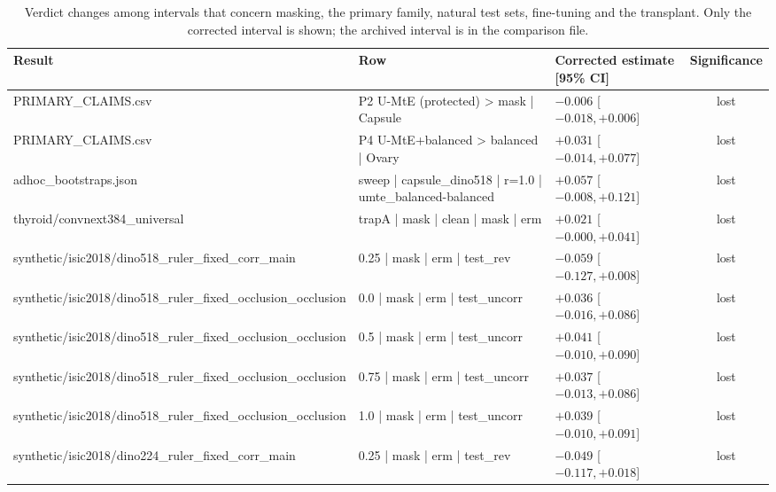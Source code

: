 \begin{table}[H]\centering\scriptsize
\caption{Verdict changes among intervals that concern masking, the primary family, natural test sets, fine-tuning and the transplant. Only the corrected interval is shown; the archived interval is in the comparison file.}\label{tab:corrclaims}
\begin{tabular}{p{4.6cm}p{5.2cm}p{3.4cm}c}\toprule
Result & Row & Corrected estimate [95\% CI] & Significance \\\midrule
PRIMARY\_\allowbreak{}CLAIMS.csv & P2 U-MtE (protected) > mask | Capsule & $-0.006$ [$-0.018, +0.006$] & lost \\
PRIMARY\_\allowbreak{}CLAIMS.csv & P4 U-MtE+balanced > balanced | Ovary & $+0.031$ [$-0.014, +0.077$] & lost \\
adhoc\_\allowbreak{}bootstraps.json & sweep | capsule\_\allowbreak{}dino518 | r=1.0 | umte\_\allowbreak{}balanced-balanced & $+0.057$ [$-0.008, +0.121$] & lost \\
thyroid/\allowbreak{}convnext384\_\allowbreak{}universal & trapA | mask | clean | mask | erm & $+0.021$ [$-0.000, +0.041$] & lost \\
synthetic/\allowbreak{}isic2018/\allowbreak{}dino518\_\allowbreak{}ruler\_\allowbreak{}fixed\_\allowbreak{}corr\_\allowbreak{}main & 0.25 | mask | erm | test\_\allowbreak{}rev & $-0.059$ [$-0.127, +0.008$] & lost \\
synthetic/\allowbreak{}isic2018/\allowbreak{}dino518\_\allowbreak{}ruler\_\allowbreak{}fixed\_\allowbreak{}occlusion\_\allowbreak{}occlusion & 0.0 | mask | erm | test\_\allowbreak{}uncorr & $+0.036$ [$-0.016, +0.086$] & lost \\
synthetic/\allowbreak{}isic2018/\allowbreak{}dino518\_\allowbreak{}ruler\_\allowbreak{}fixed\_\allowbreak{}occlusion\_\allowbreak{}occlusion & 0.5 | mask | erm | test\_\allowbreak{}uncorr & $+0.041$ [$-0.010, +0.090$] & lost \\
synthetic/\allowbreak{}isic2018/\allowbreak{}dino518\_\allowbreak{}ruler\_\allowbreak{}fixed\_\allowbreak{}occlusion\_\allowbreak{}occlusion & 0.75 | mask | erm | test\_\allowbreak{}uncorr & $+0.037$ [$-0.013, +0.086$] & lost \\
synthetic/\allowbreak{}isic2018/\allowbreak{}dino518\_\allowbreak{}ruler\_\allowbreak{}fixed\_\allowbreak{}occlusion\_\allowbreak{}occlusion & 1.0 | mask | erm | test\_\allowbreak{}uncorr & $+0.039$ [$-0.010, +0.091$] & lost \\
synthetic/\allowbreak{}isic2018/\allowbreak{}dino224\_\allowbreak{}ruler\_\allowbreak{}fixed\_\allowbreak{}corr\_\allowbreak{}main & 0.25 | mask | erm | test\_\allowbreak{}rev & $-0.049$ [$-0.117, +0.018$] & lost \\

\end{tabular}
\end{table}
